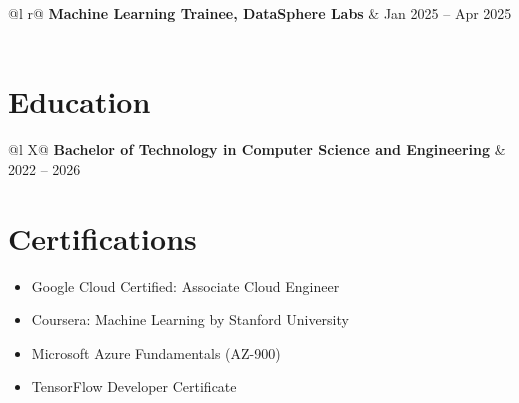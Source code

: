 \documentclass[a4paper,12pt]{article}
\begin{document}
\vspace{5pt}

\begin{tabularx}{\linewidth}{ @{}l r@{} }
\textbf{Machine Learning Trainee, DataSphere Labs} & \hfill Jan 2025 -- Apr 2025 \\[3.75pt]
 \\
\end{tabularx}

\section{Education}
\begin{tabularx}{\linewidth}{@{}l X@{}}
\textbf{Bachelor of Technology in Computer Science and Engineering} & \hfill 2022 -- 2026 \\[3.75pt]
\end{tabularx}

\section{Certifications}
\begin{itemize}[nosep,after=\strut,leftmargin=1em,itemsep=3pt]
    \item Google Cloud Certified: Associate Cloud Engineer
    \item Coursera: Machine Learning by Stanford University
    \item Microsoft Azure Fundamentals (AZ-900)
    \item TensorFlow Developer Certificate
\end{itemize}
\end{document}
